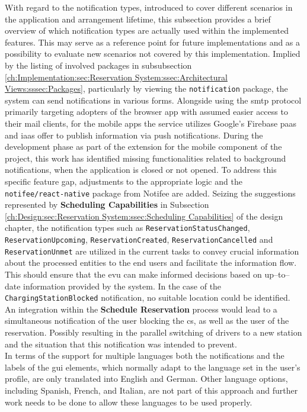 With regard to the notification types, introduced to cover different scenarios in the application and arrangement lifetime, this subsection provides a brief overview of which notification types are actually used within the implemented features.
This may serve as a reference point for future implementations and as a possibility to evaluate new scenarios not covered by this implementation.
Implied by the listing of involved packages in subsubsection \ref{ch:Implementation:sec:Reservation System:ssec:Architectural Views:sssec:Packages}, particularly by viewing the \texttt{notification} package, the system can send notifications in various forms.
Alongside using the \acrshort{smtp} protocol \cite{klensin_simple_2008} primarily targeting adopters of the browser app with assumed easier access to their mail clients, for the mobile apps the service utilizes Google's Firebase \cite{noauthor_firebase_nodate} \acrshort{paas} and \acrshort{iaas} offer to publish information via push notifications.
During the development phase as part of the extension for the mobile component of the project, this work has identified missing functionalities related to background notifications, when the application is closed or not opened. To address this specific feature gap, adjustments to the appropriate logic and the \texttt{notifee/react-native} package from Notifee \cite{noauthor_notifee_nodate} are added.
Seizing the suggestions represented by \textbf{Scheduling Capabilities} in Subsection \ref{ch:Design:sec:Reservation System:ssec:Scheduling Capabilities} of the design chapter, the notification types such as \texttt{ReservationStatusChanged}, \texttt{ReservationUpcoming}, \texttt{ReservationCreated}, \texttt{ReservationCancelled} and \texttt{ReservationUnmet} are utilized in the current tasks to convey crucial information about the processed entities to the end users and facilitate the information flow.
This should ensure that the \acrshort{evu} can make informed decisions based on up--to--date information provided by the system.
In the case of the \texttt{ChargingStationBlocked} notification, no suitable location could be identified. An integration within the \textbf{Schedule Reservation} process would lead to a simultaneous notification of the user blocking the \acrshort{cs}, as well as the user of the reservation. 
Possibly resulting in the parallel switching of drivers to a new station and the situation that this notification was intended to prevent. \\
\noindent In terms of the support for multiple languages both the notifications and the labels of the \acrshort{gui} elements, which normally adapt to the language set in the user's profile, are only translated into English and German.
Other language options, including Spanish, French, and Italian, are not part of this approach and further work needs to be done to allow these languages to be used properly.

